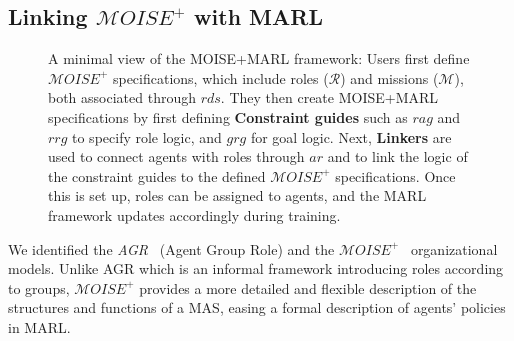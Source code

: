 \documentclass[sigconf]{aamas}
\begin{document}
\subsection{Linking $\mathcal{M}OISE^+$ with MARL}

\begin{figure}[h!]
  \centering
  
  \caption{A minimal view of the MOISE+MARL framework:
    Users first define $\mathcal{M}OISE^+$ specifications, which include roles ($\mathcal{R}$) and missions ($\mathcal{M}$), both associated through $rds$. They then create MOISE+MARL specifications by first defining \textbf{Constraint guides} such as $rag$ and $rrg$ to specify role logic, and $grg$ for goal logic.
    Next, \textbf{Linkers} are used to connect agents with roles through $ar$ and to link the logic of the constraint guides to the defined $\mathcal{M}OISE^+$ specifications. Once this is set up, roles can be assigned to agents, and the MARL framework updates accordingly during training.
  }
  \label{fig:mm_synthesis}
\end{figure}

We identified the \textit{AGR}~\cite{ferber2003} (Agent Group Role) and the $\mathcal{M}OISE^+$~\cite{Hubner2007} organizational models. Unlike AGR which is an informal framework introducing roles according to groups, $\mathcal{M}OISE^+$ provides a more detailed and flexible description of the structures and functions of a MAS, easing a formal description of agents' policies in MARL.

\
\end{document}
